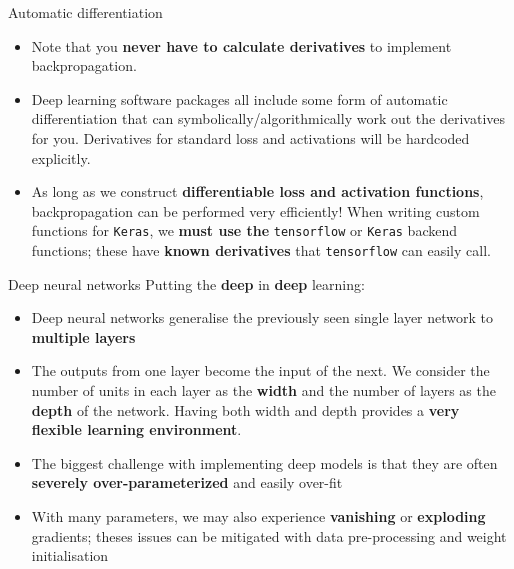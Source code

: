 \documentclass{beamer}
\begin{document}
\begin{frame}{Automatic differentiation}
\begin{itemize}
\item Note that you \textbf{never have to calculate derivatives} to implement backpropagation.

\item Deep learning software packages all include some form of automatic differentiation that can symbolically/algorithmically work out the derivatives for you. Derivatives for standard loss and activations will be hardcoded explicitly.

\item  As long as we construct \textbf{differentiable loss and activation functions}, backpropagation can be performed very efficiently!\linebreak
When writing custom functions for \texttt{Keras}, we \textbf{must use the} \texttt{tensorflow} or  \texttt{Keras} backend functions; these have \textbf{known derivatives} that \texttt{tensorflow} can easily call.
\end{itemize}
\end{frame}
\begin{frame}{Deep neural networks}
Putting the \textbf{deep} in \textbf{deep} learning:
\begin{itemize}
\item Deep neural networks generalise the previously seen single layer network to \textbf{multiple layers}
\item The outputs from one layer become the input of the next. We consider the number of units in each layer as the \textbf{width} and the number of layers as the \textbf{depth} of the network. Having both width and depth provides a \textbf{very flexible learning environment}.
\item The biggest challenge with implementing deep models is that they are often \textbf{severely over-parameterized} and easily over-fit
\item With many parameters, we may also experience \textbf{vanishing} or \textbf{exploding} gradients; theses issues can be mitigated with data pre-processing and weight initialisation
\end{itemize}
\end{frame}
\end{document}
